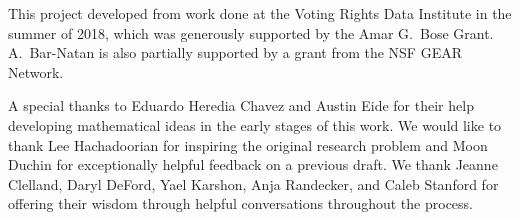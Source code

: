 
This project developed from work done at the Voting Rights Data Institute in the summer of 2018, which was generously supported by the Amar G.\ Bose Grant.  A.\ Bar-Natan is also partially supported by a grant from the NSF GEAR Network.

A special thanks to Eduardo Heredia Chavez and Austin Eide for their help developing mathematical ideas in the early stages of this work. We would like to thank Lee Hachadoorian for inspiring the original research problem and Moon Duchin for exceptionally helpful feedback on a previous draft.  We thank Jeanne Clelland, Daryl DeFord, Yael Karshon, Anja Randecker, and Caleb Stanford for offering their wisdom through helpful conversations throughout the process.